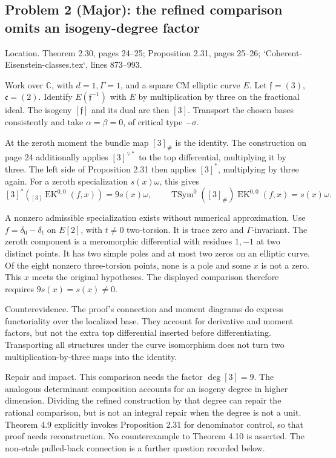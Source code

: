 \documentclass[10pt]{article}
\begin{document}
\subsection*{Problem 2 (Major): the refined comparison omits an isogeny-degree factor}
Location. Theorem 2.30, pages 24–25; Proposition 2.31, pages 25–26; `Coherent-Eisenstein-classes.tex`, lines 873–993.\par
Work over \(\mathbb C\), with \(d=1,\Gamma=1\), and a square CM elliptic curve \(E\). Let \(\mathfrak f=(3)\), \(\mathfrak c=(2)\). Identify \(E(\mathfrak f^{-1})\) with \(E\) by multiplication by three on the fractional ideal. The isogeny \([\mathfrak f]\) and its dual are then \([3]\). Transport the chosen bases consistently and take \(\alpha=\beta=0\), of critical type \(-\sigma\).\par
At the zeroth moment the bundle map \([3]_\#\) is the identity. The construction on page 24 additionally applies \([3]^{\vee *}\) to the top differential, multiplying it by three. The left side of Proposition 2.31 then applies \([3]^*\), multiplying by three again. For a zeroth specialization \(s(x)\omega\), this gives \[[3]^*({}_{[3]}\operatorname{EK}^{0,0}(f,x))=9s(x)\omega,\qquad
 \operatorname{TSym}^0([3]_\#)\operatorname{EK}^{0,0}(f,x)=s(x)\omega.\]\par
A nonzero admissible specialization exists without numerical approximation. Use \(f=\delta_0-\delta_t\) on \(E[2]\), with \(t\neq0\) two-torsion. It is trace zero and \(\Gamma\)-invariant. The zeroth component is a meromorphic differential with residues \(1,-1\) at two distinct points. It has two simple poles and at most two zeros on an elliptic curve. Of the eight nonzero three-torsion points, none is a pole and some \(x\) is not a zero. This \(x\) meets the original hypotheses. The displayed comparison therefore requires \(9s(x)=s(x)\neq0\).\par
Counterevidence. The proof’s connection and moment diagrams do express functoriality over the localized base. They account for derivative and moment factors, but not the extra top differential inserted before differentiating. Transporting all structures under the curve isomorphism does not turn two multiplication-by-three maps into the identity.\par
Repair and impact. This comparison needs the factor \(\deg[3]=9\). The analogous determinant composition accounts for an isogeny degree in higher dimension. Dividing the refined construction by that degree can repair the rational comparison, but is not an integral repair when the degree is not a unit. Theorem 4.9 explicitly invokes Proposition 2.31 for denominator control, so that proof needs reconstruction. No counterexample to Theorem 4.10 is asserted. The non-etale pulled-back connection is a further question recorded below.\par
\end{document}
